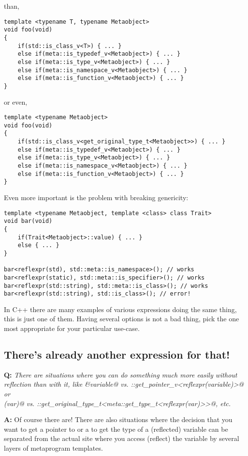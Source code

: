 than,

\begin{verbatim}
template <typename T, typename Metaobject>
void foo(void)
{
	if(std::is_class_v<T>) { ... }
	else if(meta::is_typedef_v<Metaobject>) { ... }
	else if(meta::is_type_v<Metaobject>) { ... }
	else if(meta::is_namespace_v<Metaobject>) { ... }
	else if(meta::is_function_v<Metaobject>) { ... }
}
\end{verbatim}

or even,

\begin{verbatim}
template <typename Metaobject>
void foo(void)
{
	if(std::is_class_v<get_original_type_t<Metaobject>>) { ... }
	else if(meta::is_typedef_v<Metaobject>) { ... }
	else if(meta::is_type_v<Metaobject>) { ... }
	else if(meta::is_namespace_v<Metaobject>) { ... }
	else if(meta::is_function_v<Metaobject>) { ... }
}
\end{verbatim}

Even more important is the problem with breaking genericity:

\begin{verbatim}
template <typename Metaobject, template <class> class Trait>
void bar(void)
{
	if(Trait<Metaobject>::value) { ... }
	else { ... }
}

bar<reflexpr(std), std::meta::is_namespace>(); // works
bar<reflexpr(static), std::meta::is_specifier>(); // works
bar<reflexpr(std::string), std::meta::is_class>(); // works
bar<reflexpr(std::string), std::is_class>(); // error!
\end{verbatim}


In C++ there are many examples of various expressions doing the same thing,
this is just one of them.
Having several options is not a bad thing, pick the one most appropriate for your
particular use-case.


\subsection{There's already another expression for that!}

\textbf{Q:} {\em There are situations where you can do something much more
easily without reflection than with it, like \verb@&variable@ vs.
\verb@meta::get_pointer_v<reflexpr(variable)>@ or\\\verb@decltype(var)@ vs.
\verb@meta::get_original_type_t<meta::get_type_t<reflexpr(var)>>@, etc.}

\textbf{A:} Of course there are! There are also situations where the decision
that you want to get a pointer to or a to get the type of a (reflected) variable
can be separated from the actual site where you access (reflect) the variable by
several layers of metaprogram templates.

